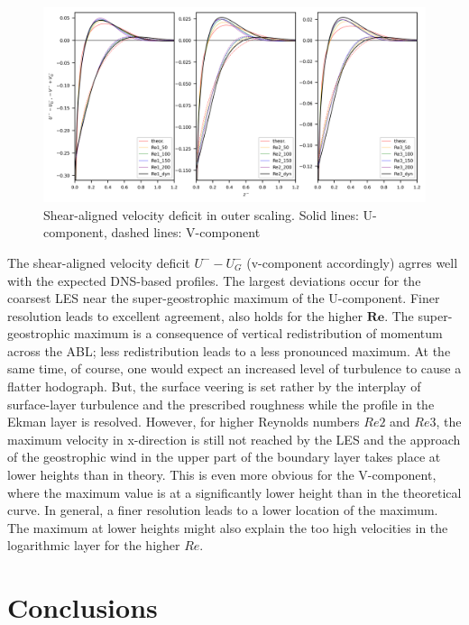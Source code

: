 \documentclass[a4paper,11pt]{article}
\newcommand{\RE}{\mathbf{Re}}
\begin{document}
\begin{figure}[ht]
  \centerline{
	\includegraphics[width=\textwidth]{figures_2024/d3y_3Re_Ekman_lin.png}
}
  \caption{Shear-aligned velocity deficit in outer scaling. Solid lines: U-component, dashed lines: V-component}
  \label{fig:3Re_Ekman}
\end{figure}

The shear-aligned velocity deficit $U^--U^-_G$ (v-component accordingly) agrres well with the expected DNS-based profiles. The largest deviations occur for the coarsest LES near the super-geostrophic maximum of the U-component. Finer resolution leads to excellent agreement, also holds for the higher $\RE$. The super-geostrophic maximum is a consequence of vertical redistribution of momentum across the ABL; less redistribution leads to a less pronounced maximum. At the same time, of course, one would expect an increased level of turbulence to cause a flatter hodograph. But, the surface veering is set rather by the interplay of surface-layer turbulence and the prescribed roughness while the profile in the Ekman layer is resolved. However, for higher Reynolds numbers $Re2$ and $Re3$, the maximum velocity in x-direction is still not reached by the LES and the approach of the geostrophic wind in the upper part of the boundary layer takes place at lower heights than in theory. This is even more obvious for the V-component, where the maximum value is at a significantly lower height than in the theoretical curve. In general, a finer resolution leads to a lower location of the maximum. The maximum at lower heights might also explain the too high velocities in the logarithmic layer for the higher $Re$. 


\section{Conclusions}
\label{conclusion}
\end{document}
